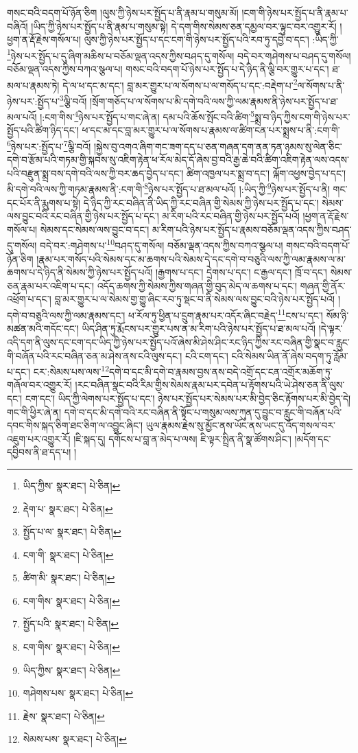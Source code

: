 གསང་བའི་བདག་པོ་ཉོན་ཅིག །ལུས་ཀྱི་ཉེས་པར་སྤྱོད་པ་ནི་རྣམ་པ་གསུམ་མོ། །ངག་གི་ཉེས་པར་སྤྱོད་པ་ནི་རྣམ་པ་བཞིའོ། །ཡིད་ཀྱི་ཉེས་པར་སྤྱོད་པ་ནི་རྣམ་པ་གསུམ་སྟེ། དེ་དག་གིས་སེམས་ཅན་དམྱལ་བར་ལྟུང་བར་འགྱུར་རོ། །ཕྱག་ན་རྡོ་རྗེས་གསོལ་པ། ལུས་ཀྱི་ཉེས་པར་སྤྱོད་པ་དང་ངག་གི་ཉེས་པར་སྤྱོད་པའི་རབ་ཏུ་དབྱེ་བ་དང་། :ཡིད་ཀྱི་\footnote{ཡིད་ཀྱིས་  སྣར་ཐང་།  པེ་ཅིན། }ཉེས་པར་སྤྱོད་པ་དུ་ཞིག་མཆིས་པ་བཅོམ་ལྡན་འདས་ཀྱིས་བཤད་དུ་གསོལ། བདེ་བར་གཤེགས་པ་བཤད་དུ་གསོལ། བཅོམ་ལྡན་འདས་ཀྱིས་བཀའ་སྩལ་པ། གསང་བའི་བདག་པོ་ཉེས་པར་སྤྱོད་པ་དེ་ཉིད་ནི་ལྕི་བར་གྱུར་པ་དང་། ཐ་མལ་པ་རྣམས་ཏེ། དེ་ལ་ཕ་དང་མ་དང་། བླ་མར་གྱུར་པ་ལ་སོགས་པ་ལ་གསོད་པ་དང་:བརྡེག་པ་\footnote{རྡེག་པ་  སྣར་ཐང་།  པེ་ཅིན། }ལ་སོགས་པ་ནི་ཉེས་པར་:སྤྱོད་པ་\footnote{སྤྱོད་པ་ལ་  སྣར་ཐང་།  པེ་ཅིན། }ལྕི་བའོ། །སྲོག་གཅོད་པ་ལ་སོགས་པ་མི་དགེ་བའི་ལས་ཀྱི་ལམ་རྣམས་ནི་ཉེས་པར་སྤྱོད་པ་ཐ་མལ་པའོ། །:ངག་གིས་\footnote{ངག་གི་  སྣར་ཐང་།  པེ་ཅིན། }ཉེས་པར་སྤྱོད་པ་གང་ཞེ་ན། དམ་པའི་ཆོས་སྤོང་བའི་ཚིག་\footnote{ཚིག་མི་  སྣར་ཐང་།  པེ་ཅིན། }སྨྲ་བ་ཉིད་ཀྱིས་ངག་གི་ཉེས་པར་སྤྱོད་པའི་ཚིག་ཉིད་དང་། ཕ་དང་མ་དང་བླ་མར་གྱུར་པ་ལ་སོགས་པ་རྣམས་ལ་ཚིག་ངན་པར་སྨྲས་པ་ནི་:ངག་གི་\footnote{ངག་གིས་  སྣར་ཐང་།  པེ་ཅིན། }ཉེས་པར་:སྤྱོད་པ་\footnote{སྤྱོད་པའི་  སྣར་ཐང་།  པེ་ཅིན། }ལྕི་བའོ། །སྐྱེས་བུ་འགའ་ཞིག་གང་ཟག་དད་པ་ཅན་གཞན་དག་ནན་ཏན་ཉམས་སུ་ལེན་ཅིང་དགེ་བ་རྩོམ་པའི་གཏམ་གྱི་སྐབས་སུ་འཇིག་རྟེན་ཕ་རོལ་མེད་དོ་ཞེས་བྱ་བའི་རྒྱ་ཆེ་བའི་ཚིག་འཇིག་རྟེན་ལས་འདས་པའི་བརྫུན་སྨྲ་བས་དགེ་བའི་ལས་ཀྱི་བར་ཆད་བྱེད་པ་དང་། ཚིག་འཁྱལ་པར་སྨྲ་བ་དང་། ལྐོག་འཕྱས་བྱེད་པ་དང་། མི་དགེ་བའི་ལས་ཀྱི་གཏམ་རྣམས་ནི་:ངག་གི་\footnote{ངག་གིས་  སྣར་ཐང་།  པེ་ཅིན། }ཉེས་པར་སྤྱོད་པ་ཐ་མལ་པའོ། །:ཡིད་ཀྱི་\footnote{ཡིད་ཀྱིས་  སྣར་ཐང་།  པེ་ཅིན། }ཉེས་པར་སྤྱོད་པ་ནི། གང་དང་པོར་ནི་རྨུགས་པ་སྟེ། དེ་ཉིད་ཀྱི་རང་བཞིན་ནི་ཡིད་ཀྱི་རང་བཞིན་གྱི་སེམས་ཀྱི་ཉེས་པར་སྤྱོད་པ་དང་། སེམས་ལས་བྱུང་བའི་རང་བཞིན་གྱི་ཉེས་པར་སྤྱོད་པ་དང་། མ་རིག་པའི་རང་བཞིན་གྱི་ཉེས་པར་སྤྱོད་པའོ། །ཕྱག་ན་རྡོ་རྗེས་གསོལ་པ། སེམས་དང་སེམས་ལས་བྱུང་བ་དང་། མ་རིག་པའི་ཉེས་པར་སྤྱོད་པ་རྣམས་བཅོམ་ལྡན་འདས་ཀྱིས་བཤད་དུ་གསོལ། བདེ་བར་:གཤེགས་པ་\footnote{གཤེགས་པས་  སྣར་ཐང་།  པེ་ཅིན། }བཤད་དུ་གསོལ། བཅོམ་ལྡན་འདས་ཀྱིས་བཀའ་སྩལ་པ། གསང་བའི་བདག་པོ་ཉོན་ཅིག །རྣམ་པར་གསོད་པའི་སེམས་དང་མ་ཆགས་པའི་སེམས་དེ་དང་དགེ་བ་བཅུའི་ལས་ཀྱི་ལམ་རྣམས་ལ་མ་ཆགས་པ་དེ་ཉིད་ནི་སེམས་ཀྱི་ཉེས་པར་སྤྱོད་པའོ། །རྒྱགས་པ་དང་། དྲེགས་པ་དང་། ང་རྒྱལ་དང་། ཁྲོ་བ་དང་། སེམས་ཅན་རྣམ་པར་འཇིག་པ་དང་། འདོད་ཆགས་ཀྱི་སེམས་ཀྱིས་གཞན་གྱི་བུད་མེད་ལ་ཆགས་པ་དང་། གཞན་གྱི་ནོར་འཕྲོག་པ་དང་། བླ་མར་གྱུར་པ་ལ་སེམས་གྱ་གྱུ་ཞིང་རབ་ཏུ་སྡང་བ་ནི་སེམས་ལས་བྱུང་བའི་ཉེས་པར་སྤྱོད་པའོ། །དགེ་བ་བཅུའི་ལས་ཀྱི་ལམ་རྣམས་དང་། ཕ་རོལ་ཏུ་ཕྱིན་པ་དྲུག་རྣམ་པར་འདོར་ཞིང་བརྗེད་\footnote{རྗེས་  སྣར་ཐང་།  པེ་ཅིན། }ངས་པ་དང་། སོམ་ཉི་མཚན་མའི་གདོང་དང་། ཡིད་ཤིན་ཏུ་རྨོངས་པར་གྱུར་པས་ན་མ་རིག་པའི་ཉེས་པར་སྤྱོད་པ་ཐ་མལ་པའོ། །དེ་ལྟར་འདི་དག་ནི་ལུས་དང་ངག་དང་ཡིད་ཀྱི་ཉེས་པར་སྤྱོད་པའོ་ཞེས་མི་ཤེས་ཤིང་རང་ཉིད་ཀྱིས་རང་བཞིན་གྱི་སྣང་བ་རླུང་གི་བཞོན་པའི་རང་བཞིན་ཅན་མ་ཤེས་ནས་ངའི་ལུས་དང་། ངའི་ངག་དང་། ངའི་སེམས་ཡིན་ནོ་ཞེས་བདག་ཏུ་རློམ་པ་དང་། ངར་:སེམས་པས་ལས་\footnote{སེམས་པས་  སྣར་ཐང་།  པེ་ཅིན། }དགེ་བ་དང་མི་དགེ་བ་རྣམས་བྱས་ནས་བདེ་འགྲོ་དང་ངན་འགྲོར་མཆོག་ཏུ་གཞོལ་བར་འགྱུར་རོ། །རང་བཞིན་སྣང་བའི་རིམ་གྱིས་སེམས་རྣམ་པར་དབེན་པ་རྟོགས་པའི་ཡེ་ཤེས་ཅན་ནི་ལུས་དང་། ངག་དང་། ཡིད་ཀྱི་ལེགས་པར་སྤྱོད་པ་དང་། ཉེས་པར་སྤྱོད་པར་སེམས་པར་མི་བྱེད་ཅིང་རྟོགས་པར་མི་བྱེད་དེ། གང་གི་ཕྱིར་ཞེ་ན། དགེ་བ་དང་མི་དགེ་བའི་རང་བཞིན་ནི་སྟོང་པ་གསུམ་ལས་ཀུན་དུ་བྱུང་བ་རླུང་གི་བཞོན་པའི་དབང་གིས་སྐད་ཅིག་ཐང་ཅིག་ལ་འབྱུང་ཞིང་། ཡུལ་རྣམས་རྗེས་སུ་མྱོང་ནས་ཡོང་ནས་ཡང་དུ་འོད་གསལ་བར་འཇུག་པར་འགྱུར་རོ། །ཇི་སྐད་དུ། དགོངས་པ་བླ་ན་མེད་པ་ལས། ཇི་ལྟར་སྤྲིན་ནི་སྣ་ཚོགས་ཤིང་། །མདོག་དང་དབྱིབས་ནི་ཐ་དད་པ། །
